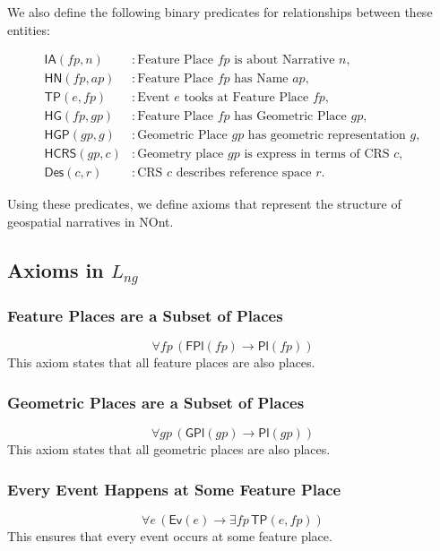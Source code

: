 We also define the following binary predicates for relationships between these entities:

\begin{align*}
    \textsf{IA}(fp, n) &: \text{Feature Place } fp \text{ is about Narrative } n, \\
    \textsf{HN}(fp, ap) &: \text{Feature Place } fp \text{ has Name } ap, \\
    \textsf{TP}(e, fp) &: \text{Event } e \text{ tooks at Feature Place } fp, \\
    \textsf{HG}(fp, gp) &: \text{Feature Place } fp \text{ has Geometric Place } gp, \\
    \textsf{HGP}(gp, g) &: \text{Geometric Place } gp \text{ has geometric representation } g, \\
    \textsf{HCRS}(gp, c) &: \text{Geometry place } gp \text{ is express in terms of CRS } c, \\
    \textsf{Des}(c, r) &: \text{CRS } c \text{ describes reference space } r.
\end{align*}

Using these predicates, we define axioms that represent the structure of geospatial narratives in NOnt.

\subsection{Axioms in \( L_{ng} \)}\label{V-subsec:axioms-lng}

\subsubsection{Feature Places are a Subset of Places}
\begin{equation}\label{eq:axiom1}
    \forall fp \, (\textsf{FPl}(fp) \rightarrow \textsf{Pl}(fp))
\end{equation}
This axiom states that all feature places are also places.

\subsubsection{Geometric Places are a Subset of Places}
\begin{equation}\label{eq:axiom2}
    \forall gp \, (\textsf{GPl}(gp) \rightarrow \textsf{Pl}(gp))
\end{equation}
This axiom states that all geometric places are also places.

\subsubsection{Every Event Happens at Some Feature Place}
\begin{equation}\label{eq:axiom3}
    \forall e \, (\textsf{Ev}(e) \rightarrow \exists fp \, \textsf{TP}(e, fp))
\end{equation}
This ensures that every event occurs at some feature place.


